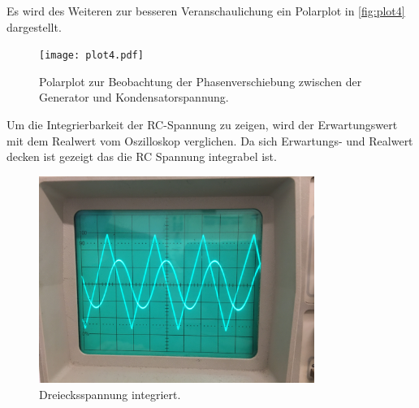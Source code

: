 Es wird des Weiteren zur besseren Veranschaulichung ein Polarplot in \autoref{fig:plot4} dargestellt.
\begin{figure}[H]
  \centering
  \texttt{[image: plot4.pdf]}
  \caption{Polarplot zur Beobachtung der Phasenverschiebung zwischen der Generator und Kondensatorspannung.}
  \label{fig:plot4}
\end{figure}

Um die Integrierbarkeit der RC-Spannung zu zeigen, wird der Erwartungswert mit dem
Realwert vom Oszilloskop verglichen. Da sich Erwartungs- und Realwert decken ist gezeigt
das die RC Spannung integrabel ist.
\begin{figure}[H]
  \centering
  \includegraphics[width=0.8\textwidth]{pictures/dreieck.jpg}
  \caption{Dreiecksspannung integriert.}
  \label{fig:dreieck}
\end{figure}